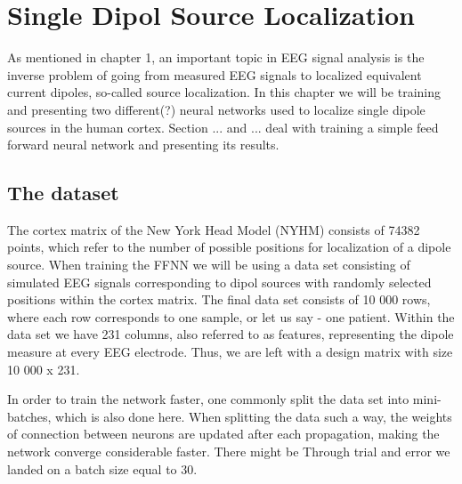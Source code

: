 \documentclass[a4paper, UKenglish, 11pt]{uiomaster}
\begin{document}
\chapter{Single Dipol Source Localization}

As mentioned in chapter 1, an important topic in EEG signal analysis is the inverse problem of going from measured EEG signals to localized equivalent current dipoles, so-called source localization. In this chapter we will be training and presenting two different(?) neural networks used to localize single dipole sources in the human cortex. Section ...  and ... deal with training a simple feed forward neural network and presenting its results.


\section{The dataset}
The cortex matrix of the New York Head Model (NYHM) consists of 74382 points, which refer to the number of possible positions for localization of a dipole source. When training the FFNN we will be using a data set consisting of simulated EEG signals corresponding to dipol sources with randomly selected positions within the cortex matrix. The final data set consists of 10 000 rows, where each row corresponds to one sample, or let us say - one patient. Within the data set we have 231 columns, also referred to as features, representing the dipole measure at every EEG electrode. Thus, we are left with a design matrix with size 10 000 x 231.

In order to train the network faster, one commonly split the data set into mini-batches, which is also done here. When splitting the data such a way, the weights of connection between neurons are updated after each propagation, making the network converge considerable faster. There might be Through trial and error we landed on a batch size equal to 30.

\end{document}
